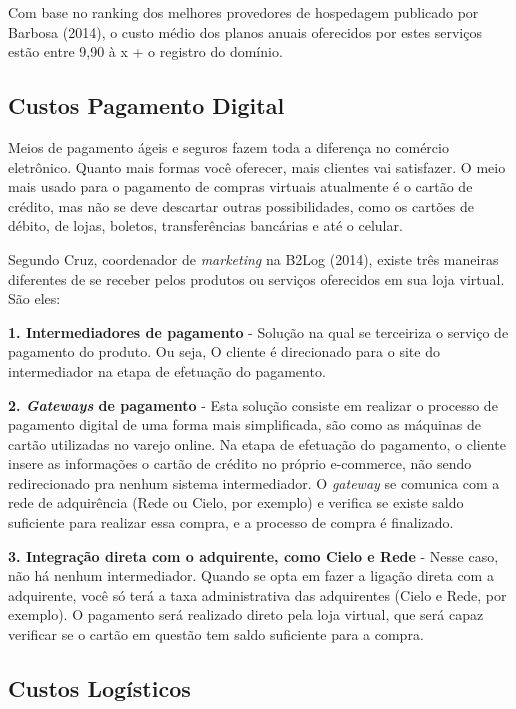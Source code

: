 Com base no ranking dos melhores provedores de hospedagem publicado por Barbosa (2014)\nocite{Barbosa2014}, o custo médio dos planos anuais oferecidos por estes serviços estão entre 9,90 à x + o registro do domínio.

\subsection{Custos Pagamento Digital}

Meios de pagamento ágeis e seguros fazem toda a diferença no comércio eletrônico. Quanto mais formas você oferecer, mais clientes vai satisfazer. O meio mais usado para o pagamento de compras virtuais atualmente é o cartão de crédito, mas não se deve descartar outras possibilidades, como os cartões de débito, de lojas, boletos, transferências bancárias e até o celular. 

Segundo Cruz, coordenador de \textit{marketing} na B2Log (2014)\nocite{Cruz2014}, existe três maneiras diferentes de se receber pelos produtos ou serviços oferecidos em sua loja virtual. São eles:

\textbf{1. Intermediadores de pagamento} - Solução na qual se terceiriza o serviço de pagamento do produto. Ou seja, O cliente é direcionado para o site do intermediador na etapa de efetuação do pagamento.

\textbf{2. \textit{Gateways} de pagamento} - Esta solução consiste em realizar o processo de pagamento digital de uma forma mais simplificada, são como as máquinas de cartão utilizadas no varejo online. Na etapa de efetuação do pagamento, o cliente insere as informações o cartão de crédito no próprio e-commerce, não sendo redirecionado pra nenhum sistema intermediador. O \textit{gateway} se comunica com a rede de adquirência (Rede ou Cielo, por exemplo) e verifica se existe saldo suficiente para realizar essa compra, e a processo de compra é finalizado.

\textbf{3. Integração direta com o adquirente, como Cielo e Rede} - Nesse caso, não há nenhum intermediador. Quando se opta em fazer a ligação direta com a adquirente, você só terá a taxa administrativa das adquirentes (Cielo e Rede, por exemplo). O pagamento será realizado direto pela loja virtual, que será capaz verificar se o cartão em questão tem saldo suficiente para a compra.

\subsection{Custos Logísticos}

